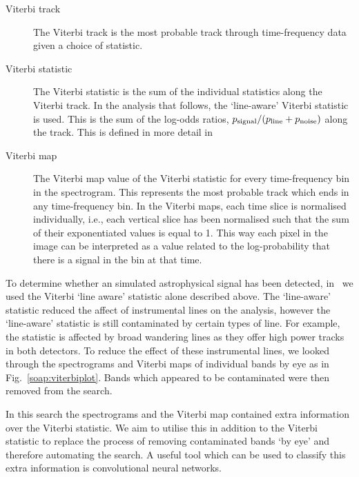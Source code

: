 %
\begin{description} 
	\item [Viterbi track] The Viterbi track is the most probable track through time-frequency data given a choice of statistic. 
	\item [Viterbi statistic] The Viterbi statistic is the sum of the individual statistics along the Viterbi track. In the analysis that follows, the `line-aware' Viterbi statistic is used. 
	This is the sum of the log-odds ratios, $p_{\rm signal}/(p_{\rm line} + p_{\rm noise})$ along the track. This is defined in more detail in \cite{bayley2019SOAPGeneralised}
	\item [Viterbi map]
	The Viterbi map value of the Viterbi statistic for every time-frequency bin in the spectrogram. 
	This represents the most probable track which ends in any time-frequency bin.
	In the Viterbi maps, each time slice is normalised individually, i.e., each
	vertical slice has been normalised such that the sum of their exponentiated
	values is equal to 1. This way each pixel in the image can be interpreted as a
	value related to the log-probability that there is a signal in the bin at that
	time.
\end{description}

%
To determine whether an simulated astrophysical signal has been detected,
in~\cite{bayley2019SOAPGeneralised} we used the Viterbi `line aware' statistic alone described above.  
The `line-aware' statistic reduced the affect of instrumental lines on the analysis, however the `line-aware' statistic is still contaminated by certain types of line.
For example, the statistic is affected by broad wandering lines as they offer high power tracks in both detectors.
To reduce the effect of these instrumental lines, we looked through the spectrograms and
Viterbi maps of individual bands by eye as in Fig.~\ref{soap:viterbiplot}.
Bands which appeared to be contaminated were then removed from the search.

%
In this search the spectrograms and the Viterbi map contained extra information
over the Viterbi statistic. 
We aim to utilise this in addition to the Viterbi statistic to replace the process of removing contaminated bands `by eye' and therefore automating the search. 
A useful tool which can be used to classify this extra information is convolutional neural networks. 

